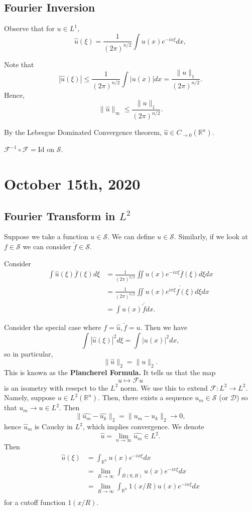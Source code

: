 \documentclass[11pt]{scrartcl}
\newcommand{\R}{\mathbb{R}}
\renewcommand{\hat}{\widehat}
\begin{document}
\subsection{Fourier Inversion}
Observe that for $u \in L^1$, 
$$\hat{u}(\xi) = \frac{1}{(2\pi)^{n/2}} \int u(x)e^{-ix\xi}dx,$$

Note that 
$$|\hat{u}(\xi)| \le \frac{1}{(2\pi)^{n/2}} \int |u(x)|dx = \frac{\|u\|_1}{(2\pi)^{n/2}}.$$
Hence,
$$\|\hat{u}\|_{\infty} \le \frac{\|u\|_1}{(2\pi)^{n/2}}.$$

By the Lebesgue Dominated Convergence theorem, $\hat{u} \in C_{\to 0}(\R^n)$.

\begin{exercise} $\mathcal F^{-1} \circ \mathcal F = \text{Id}$ on $\mathcal S$.
\end{exercise}
\pagebreak
\section{October 15th, 2020}
\subsection{Fourier Transform in $L^2$}
Suppose we take a function $u \in \mathcal S$.  We can define $\hat{u} \in \mathcal S$.  Similarly, if we look at $f \in \mathcal S$ we can consider $\check{f} \in \mathcal S$.

Consider 
\begin{align*}
\int \hat{u}(\xi) \overline{f}(\xi)d\xi &= \frac{1}{(2\pi)^{n/2}} \iint u(x)e^{-ix\xi}\overline{f}(\xi)d\xi dx \\
&= \frac{1}{(2\pi)^{n/2}} \iint u(x) \overline{e^{ix\xi}f(\xi)} d\xi dx\\
&= \int u(x) \overline{\check{f}}dx.
\end{align*}

Consider the special case where $f = \hat{u}, \check{f} = u$.  Then we have 
$$\int |\hat{u}(\xi)|^2 d\xi = \int |u(x)|^2dx,$$
so in particular,
$$\|\hat{u}\|_2 = \|u\|_2.$$
This is known as the\textbf{ Plancherel Formula.} It tells us that the map
$$u \mapsto \mathcal F u$$
is an isometry with resepct to the $L^2$ norm.  We use this to extend $\mathcal F : L^2 \to L^2$.  Namely, suppose $u \in L^2(\R^n)$.  Then, there exists a sequence $u_m \in \mathcal S$ (or $\mathcal D$) so that $u_m \to u \in L^2$.  
Then 
$$\| \hat{u_m} - \hat{u_k}\|_2 = \|u_m - u_k \|_2 \rightarrow 0,$$
hence $\hat{u}_m$ is Cauchy in $L^2$, which implies convergence.  We denote 
$$\hat{u} = \lim_{n \to \infty} \hat{u_m} \in L^2.$$
Then
\begin{align*}
\hat{u}(\xi) &= \int_{\R^n} u(x) e^{-ix\xi}dx \\
&= \lim_{R \to \infty} \int_{B(0, R)} u(x)e^{-ix\xi}dx \\
&= \lim_{R \to \infty} \int_{\R^n} 1(x/R)u(x)e^{-ix\xi}dx\\
\end{align*}
for a cutoff function $1(x/R)$.
\end{document}
